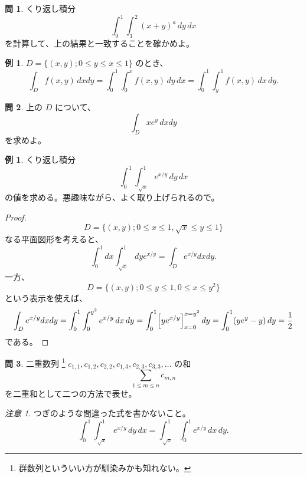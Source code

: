 \documentclass[a4paper]{jsarticle}
\theoremstyle{definition}
\newtheorem{Example}[Theorem]{例}
\newtheorem{Exercise}{問}%
\theoremstyle{remark}
\newtheorem{Remark}{注意}
\begin{document}
\begin{Exercise} 
くり返し積分
\[
\int_0^1 \int_1^2 (x+y)^a\, dy\, dx
\]
を計算して、上の結果と一致することを確かめよ。
\end{Exercise}

\begin{Example}
$D = \{ (x,y); 0 \leq y \leq x \leq 1 \}$ のとき、
\[
\int_D f(x,y)\, dxdy = \int_0^1 \int_0^x f(x,y)\, dy\,dx 
= \int_0^1 \int_y^1 f(x,y)\, dx\, dy. 
\]
\end{Example}

\begin{Exercise}
上の $D$ について、
\[
\int_D xe^y\, dxdy 
\]
を求めよ。
\end{Exercise}

\begin{Example}
くり返し積分
\[
\int_0^1 \int_{\sqrt{x}}^1 e^{x/y}\, dy\, dx
\]
の値を求める。悪趣味ながら、よく取り上げられるので。
\end{Example}

\begin{proof}
\[
D = \{ (x,y); 0 \leq x\leq 1, \sqrt{x} \leq y \leq 1\}
\]
なる平面図形を考えると、
\[
\int_0^1 dx \int_{\sqrt{x}}^1 dy e^{x/y}
= \int_D e^{x/y} dxdy.
\]
一方、
\[
D = \{ (x,y); 0 \leq y \leq 1, 0 \leq x \leq y^2\}
\]
という表示を使えば、
\[
\int_D e^{x/y} dxdy = \int_0^1 \int_0^{y^2} e^{x/y}\,dx \, dy
= \int_0^1 \Bigl[ye^{x/y}\Bigr]_{x=0}^{x=y^2}\,dy
= \int_0^1(ye^y - y)\,dy = \frac{1}{2}
\]
である。
\end{proof}

\begin{Exercise}
二重数列
\footnote{
群数列といういい方が馴染みかも知れない。} 
$c_{1,1}, c_{1,2}, c_{2,2}, c_{1,3}, c_{2,3}, c_{3,3}, \dots$ の和
\[
\sum_{1 \leq m \leq n} c_{m,n} 
\]
を二重和として二つの方法で表せ。
\end{Exercise}

\begin{Remark}{\small
つぎのような間違った式を書かないこと。
\[
\int_0^1 \int_{\sqrt{x}}^1 e^{x/y}\, dy\, dx
= \int_{\sqrt{x}}^1 \int_0^1 e^{x/y}\, dx\, dy. 
\]
}
\end{Remark} 



\end{document}
